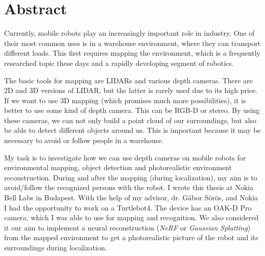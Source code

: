 \chapter*{Abstract}
Currently, mobile robots play an increasingly important role in industry. One of their most common uses is in a warehouse environment, where they can transport different loads. This first requires mapping the environment, which is a frequently researched topic these days and a rapidly developing segment of robotics.

The basic tools for mapping are LIDARs and various depth cameras. There are 2D and 3D versions of LIDAR, but the latter is rarely used due to its high price. If we want to use 3D mapping (which promises much more possibilities), it is better to use some kind of depth camera. This can be RGB-D or stereo. By using these cameras, we can not only build a point cloud of our surroundings, but also be able to detect different objects around us. This is important because it may be necessary to avoid or follow people in a warehouse.

My task is to investigate how we can use depth cameras on mobile robots for environmental mapping, object detection and photorealistic environment reconstruction. During and after the mapping (during localization), my aim is to avoid/follow the recognized persons with the robot. I wrote this thesis at Nokia Bell Labs in Budapest. With the help of my advisor, dr. Gábor Sörös, and Nokia I had the opportunity to work on a Turtlebot4. The device has an OAK-D Pro camera, which I was able to use for mapping and recognition. We also considered it our aim to implement a neural reconstruction (\textit {NeRF} or \textit{Gaussian Splatting}) from the mapped environment to get a photorealistic picture of the robot and its surroundings during localization.

\vfill
\selectthesislanguage

\setcounter{romanPage}{\value{page}}
